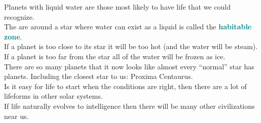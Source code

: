 \documentclass[12pt]{article}
\theoremstyle{definition}
\newcommand{\defnterm}[1]{\textbf{\textcolor{teal}{#1}}\index{#1}}
\begin{document}
Planets with liquid water are those most likely to have life that we could recognize. \\
The are around a star where water can exist as a liquid is called the \defnterm{habitable zone}. \\
If a planet is too close to its star it will be too hot (and the water will be steam). \\
If a planet is too far from the star all of the water will be frozen as ice. \\

There are so many planets that it now looks like almost every ``normal'' star has planets.
Including the closest star to us: Proxima Centaurus. \\

Is it easy for life to start when the conditions are right, then there are a lot of lifeforms in other solar systems. \\

If life naturally evolves to intelligence then there will be many other civilizations near us.
\clearpage
\printindex
\end{document}
